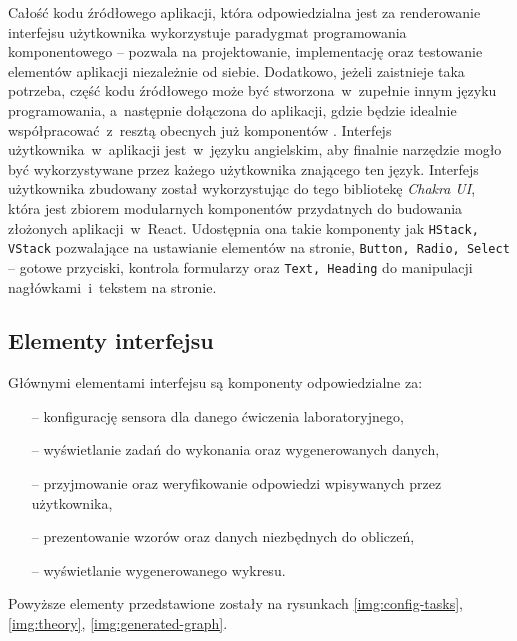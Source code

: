Całość kodu źródłowego aplikacji, która odpowiedzialna jest za renderowanie interfejsu użytkownika
wykorzystuje paradygmat programowania komponentowego -- pozwala na projektowanie, implementację oraz
testowanie elementów aplikacji niezależnie od siebie. Dodatkowo, jeżeli zaistnieje taka potrzeba,
część kodu źródłowego może być stworzona~w~zupełnie innym języku programowania, a~następnie
dołączona do aplikacji, gdzie będzie idealnie współpracować~z~resztą obecnych już komponentów
\cite{component-programming}. Interfejs użytkownika~w~aplikacji jest~w~języku angielskim, aby
finalnie narzędzie mogło być wykorzystywane przez każego użytkownika znającego ten język. Interfejs
użytkownika zbudowany został wykorzystując do tego bibliotekę \textit{Chakra UI}, która jest zbiorem
modularnych komponentów przydatnych do budowania złożonych aplikacji~w~React. Udostępnia ona takie
komponenty jak \texttt{HStack, VStack} pozwalające na ustawianie elementów na stronie,
\texttt{Button, Radio, Select} -- gotowe przyciski, kontrola formularzy oraz \texttt{Text, Heading}
do manipulacji nagłówkami~i~tekstem na stronie.

\subsection{Elementy interfejsu}
Głównymi elementami interfejsu są komponenty odpowiedzialne za:
\begin{itemize}
  \item[--] konfigurację sensora dla danego ćwiczenia laboratoryjnego,
  \item[--] wyświetlanie zadań do wykonania oraz wygenerowanych danych,
  \item[--] przyjmowanie oraz weryfikowanie odpowiedzi wpisywanych przez użytkownika,
  \item[--] prezentowanie wzorów oraz danych niezbędnych do obliczeń,
  \item[--] wyświetlanie wygenerowanego wykresu.
\end{itemize}
Powyższe elementy przedstawione zostały na rysunkach \ref{img:config-tasks}, \ref{img:theory},
\ref{img:generated-graph}.

\begingroup
{}


